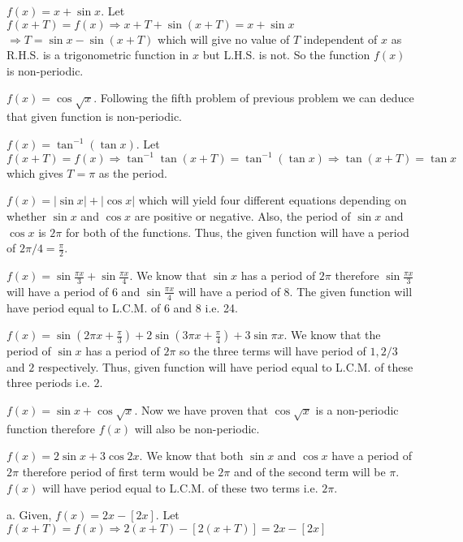 \item $f(x) = x + \sin x$. Let $f(x + T) = f(x) \Rightarrow x + T + \sin(x + T) = x + \sin x$
  $\Rightarrow T = \sin x - \sin(x + T)$ which will give no value of $T$ independent of
  $x$ as R.H.S. is a trigonometric function in $x$ but L.H.S. is not. So the function
  $f(x)$ is non-periodic.

\item $f(x) = \cos\sqrt{x}$. Following the fifth problem of previous problem we can deduce that
  given function is non-periodic.

\item $f(x) = \tan^{-1}(\tan x)$. Let $f(x + T) = f(x) \Rightarrow \tan^{-1}\tan(x + T) =
  \tan^{-1}(\tan x) \Rightarrow \tan(x + T) = \tan x$ which gives $T = \pi$ as the period.

\item $f(x) = |\sin x| + |\cos x|$ which will yield four different equations depending on whether
  $\sin x$ and $\cos x$ are positive or negative. Also, the period of $\sin x$ and
  $\cos x$ is $2\pi$ for both of the functions. Thus, the given function will have a period
  of $2\pi/4 = \frac{\pi}{2}$.

\item $f(x) = \sin\frac{\pi x}{3} + \sin\frac{\pi x}{4}$. We know that $\sin x$ has a period
  of $2\pi$ therefore $\sin\frac{\pi x}{3}$ will have a period of $6$ and
  $\sin \frac{\pi x}{4}$ will have a period of $8$. The given function will have period
  equal to L.C.M. of $6$ and $8$ i.e. 24.

\item $f(x) = \sin\left(2\pi x + \frac{\pi}{3}\right) + 2\sin\left(3\pi x + \frac{\pi}{4}\right) +
  3\sin\pi x$. We know that the period of $\sin x$ has a period of $2\pi$ so the three
  terms will have period of $1, 2/3$ and $2$ respectively. Thus, given function will have
  period equal to L.C.M. of these three periods i.e. $2$.

\item $f(x) = \sin x + \cos\sqrt{x}$. Now we have proven that $\cos\sqrt{x}$ is a
  non-periodic function therefore $f(x)$ will also be non-periodic.
  \stopitemize
\item $f(x) = 2\sin x + 3\cos 2x$. We know that both $\sin x$ and $\cos x$ have a period of
  $2\pi$ therefore period of first term would be $2\pi$ and of the second term will be
  $\pi$. $f(x)$ will have period equal to L.C.M. of these two terms i.e. $2\pi$.

\item a. Given, $f(x) = 2x - [2x]$. Let $f(x + T) = f(x) \Rightarrow 2(x + T) - [2(x + T)] = 2x -
  [2x]$

